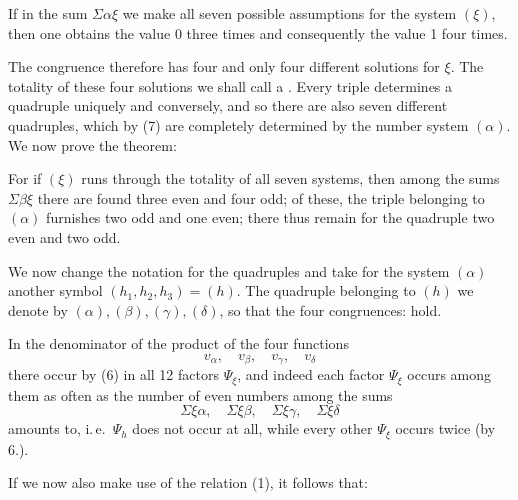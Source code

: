 
If in the sum $\Sigma \alpha\xi$ we make all seven possible assumptions for the system $(\xi)$, then one obtains the value 0 three times and consequently the value 1 four times.

The congruence
therefore has four and only four different solutions for $\xi$. The totality of these four solutions we shall call a . Every triple determines a quadruple uniquely and conversely, and so there are also seven different quadruples, which by (7) are completely determined by the number system $(\alpha)$. We now prove the theorem:


For if $(\xi)$ runs through the totality of all seven systems, then among the sums $\Sigma \beta\xi$ there are found three even and four odd; of these, the triple belonging to $(\alpha)$ furnishes two odd and one even; there thus remain for the quadruple two even and two odd.

We now change the notation for the quadruples and take for the system $(\alpha)$ another symbol $(h_1, h_2, h_3) = (h)$. The quadruple belonging to $(h)$ we denote by $(\alpha), (\beta), (\gamma), (\delta)$, so that the four congruences:
hold.

In the denominator of the product of the four functions
\[
v_\alpha, \quad v_\beta, \quad v_\gamma, \quad v_\delta
\]
there occur by (6) in all 12 factors $\Psi_\xi$, and indeed each factor $\Psi_\xi$ occurs among them as often as the number of even numbers among the sums
\[
\Sigma \xi\alpha, \quad \Sigma \xi\beta, \quad \Sigma \xi\gamma, \quad \Sigma \xi\delta
\]
amounts to, i.\,e.\ $\Psi_h$ does not occur at all, while every other $\Psi_\xi$ occurs twice (by 6.).

If we now also make use of the relation (1), it follows that:
